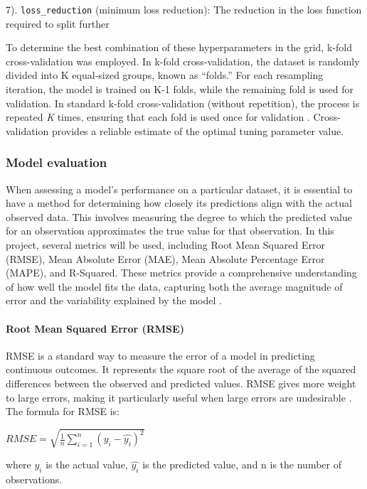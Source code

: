\documentclass[11pt,a4paper,]{article}
\begin{document}
7). \texttt{loss\_reduction} (minimum loss reduction): The reduction in the loss function required to split further

To determine the best combination of these hyperparameters in the grid, k-fold cross-validation was employed. In k-fold cross-validation, the dataset is randomly divided into K equal-sized groups, known as ``folds.'' For each resampling iteration, the model is trained on K-1 folds, while the remaining fold is used for validation. In standard k-fold cross-validation (without repetition), the process is repeated \emph{K} times, ensuring that each fold is used once for validation \autocite{tidymodels}. Cross-validation provides a reliable estimate of the optimal tuning parameter value.

\subsubsection{Model evaluation}\label{model-evaluation}

When assessing a model's performance on a particular dataset, it is essential to have a method for determining how closely its predictions align with the actual observed data. This involves measuring the degree to which the predicted value for an observation approximates the true value for that observation. In this project, several metrics will be used, including Root Mean Squared Error (RMSE), Mean Absolute Error (MAE), Mean Absolute Percentage Error (MAPE), and R-Squared. These metrics provide a comprehensive understanding of how well the model fits the data, capturing both the average magnitude of error and the variability explained by the model \autocite{ISLR,Hastie09}.

\paragraph{Root Mean Squared Error (RMSE)}\label{root-mean-squared-error-rmse}

RMSE is a standard way to measure the error of a model in predicting continuous outcomes. It represents the square root of the average of the squared differences between the observed and predicted values. RMSE gives more weight to large errors, making it particularly useful when large errors are undesirable \autocite{ISLR,Hastie09}. The formula for RMSE is:

\(RMSE = \sqrt{\frac{1}{n} {\sum^n_{i=1}(y_i-\hat{y_i})^2}}\)

where \(y_i\) is the actual value, \(\hat{y_i}\) is the predicted value, and n is the number of observations.
\end{document}
